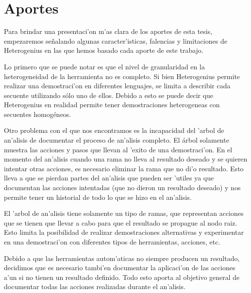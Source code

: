 \chapter{Aportes}

Para brindar una presentaci'on m'as clara de los aportes de esta tesis, empezaremos se\~nalando algunas caracter'isticas, falencias y limitaciones de Heterogenius en las que hemos basado cada aporte de este trabajo.

Lo primero que se puede notar es que el nivel de granularidad en la heterogeneidad de la herramienta no es completo. 
Si bien Heterogenius permite realizar una demostraci'on en diferentes lenguajes, se limita a describir cada secuente utilizando sólo uno de ellos. 
Debido a esto se puede decir que Heterogenius en realidad permite tener demostraciones heterogeneas con secuentes homogéneos. 

Otro problema con el que nos encontramos es la incapacidad del 'arbol de an'alisis de documentar el proceso de an'alisis completo. El árbol solamente muestra las acciones y pasos que llevan al 'exito de una demostraci'on. En el momento del an'alisis cuando una rama no lleva al resultado deseado y se quieren intentar otras acciones, es necesario eliminar la rama que no di'o resultado. Esto lleva a que se pierdan partes del an'alisis que pueden ser 'utiles ya que documentan las acciones intentadas (que no dieron un resultado deseado) y nos permite tener un historial de todo lo que se hizo en el an'alisis.

El 'arbol de an'alisis tiene solamente un tipo de ramas, que representan acciones que se tienen que llevar a cabo para que el resultado se propague al nodo raiz. Esto limita la posibilidad de realizar demostraciones alternativas y experimentar en una demostraci'on con diferentes tipos de herramientas, acciones, etc.

Debido a que las herramientas autom'aticas no siempre producen un resultado, decidimos que es necesario tambi'en documentar la aplicaci'on de las acciones a'un si no tienen un resultado definido. Todo esto aporta al objetivo general de documentar todas las acciones realizadas durante el an'alisis.









